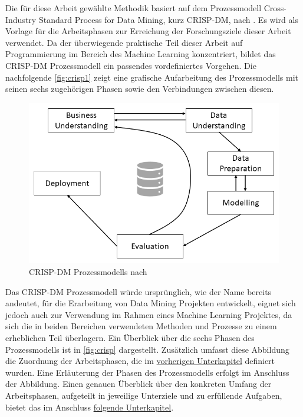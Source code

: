 Die für diese Arbeit gewählte Methodik basiert auf dem Prozessmodell Cross-Industry Standard Process for Data Mining, kurz CRISP-DM, nach \cite{Chapman2000}. Es wird als Vorlage für die Arbeitsphasen zur Erreichung der Forschungsziele dieser Arbeit verwendet. 
Da der überwiegende praktische Teil dieser Arbeit auf Programmierung im Bereich des Machine Learning konzentriert, bildet das CRISP-DM Prozessmodell ein passendes vordefiniertes Vorgehen. Die nachfolgende \autoref{fig:crisp1} zeigt eine grafische Aufarbeitung des Prozessmodells mit seinen sechs zugehörigen Phasen sowie den Verbindungen zwischen diesen.

\begin{figure}[H]
    \centering
    \includegraphics[width=\textwidth]{images/CRISP-DM1}
    \caption{CRISP-DM Prozessmodells nach \cite{Chapman2000}}\label{fig:crisp1}
\end{figure}

Das CRISP-DM Prozessmodell würde ursprünglich, wie der Name bereits andeutet, für die Erarbeitung von Data Mining Projekten entwickelt, eignet sich jedoch auch zur Verwendung im Rahmen eines Machine Learning Projektes, da sich die in beiden Bereichen verwendeten Methoden und Prozesse zu einem erheblichen Teil überlagern. Ein Überblick über die sechs Phasen des Prozessmodells ist in \autoref{fig:crisp} dargestellt. Zusätzlich umfasst diese Abbildung die Zuordnung der Arbeitsphasen, die im \hyperref[phases_definition]{vorherigen Unterkapitel} definiert wurden. Eine Erläuterung der Phasen des Prozessmodells erfolgt im Anschluss der Abbildung. Einen genauen Überblick über den konkreten Umfang der Arbeitsphasen, aufgeteilt in jeweilige Unterziele und zu erfüllende Aufgaben, bietet das im Anschluss \hyperref[timecourse] {folgende Unterkapitel}. 

